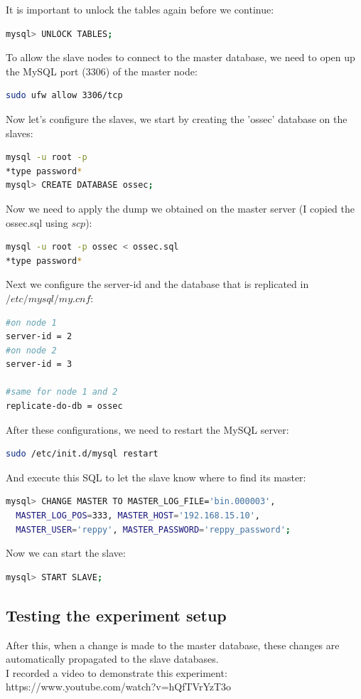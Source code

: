 \documentclass[12pt]{report}
\begin{document}
It is important to unlock the tables again before we continue:
\begin{lstlisting}[language=bash]
mysql> UNLOCK TABLES;
\end{lstlisting}

To allow the slave nodes to connect to the master database, we need to
open up the MySQL port ($3306$) of the master node:
\begin{lstlisting}[language=bash]
sudo ufw allow 3306/tcp
\end{lstlisting}

Now let's configure the slaves, we start by creating the 'ossec'
database on the slaves:
\begin{lstlisting}[language=bash]
mysql -u root -p
*type password*
mysql> CREATE DATABASE ossec;
\end{lstlisting}
Now we need to apply the dump we obtained on the master server (I
copied the ossec.sql using $scp$):
\begin{lstlisting}[language=bash]
mysql -u root -p ossec < ossec.sql
*type password*
\end{lstlisting}

Next we configure the server-id and the database that is replicated in
$/etc/mysql/my.cnf$:
\begin{lstlisting}[language=bash]
#on node 1
server-id = 2 
#on node 2
server-id = 3

#same for node 1 and 2
replicate-do-db = ossec
\end{lstlisting}

After these configurations, we need to restart the MySQL server:
\begin{lstlisting}[language=bash]
sudo /etc/init.d/mysql restart
\end{lstlisting}

And execute this SQL to let the slave know where to find its master:
\begin{lstlisting}[language=bash]
mysql> CHANGE MASTER TO MASTER_LOG_FILE='bin.000003',
  MASTER_LOG_POS=333, MASTER_HOST='192.168.15.10', 
  MASTER_USER='reppy', MASTER_PASSWORD='reppy_password';
\end{lstlisting}
Now we can start the slave:
\begin{lstlisting}[language=bash]
mysql> START SLAVE;
\end{lstlisting}

\subsection{Testing the experiment setup}
After this, when a change is made to the master database, these
changes are automatically propagated to the slave databases.\\
 I recorded a video to demonstrate this experiment:\\
https://www.youtube.com/watch?v=hQfTVrYzT3o\\
\end{document}
